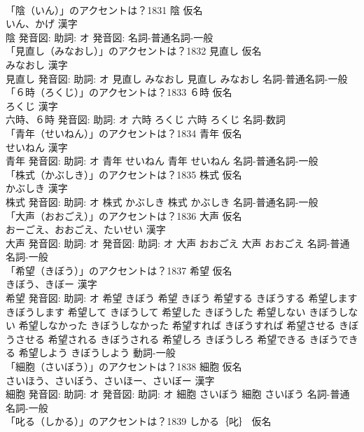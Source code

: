 \documentclass[8pt]{extreport}
\begin{document}
\begin{CJK}{UTF8}{min}
\\	「陰（いん）」のアクセントは？1831	陰 仮名　
\\	いん、かげ 漢字　
\\	陰 発音図: 助詞: オ 発音図:							名詞-普通名詞-一般 
\\	「見直し（みなおし）」のアクセントは？1832	見直し 仮名　
\\	みなおし 漢字　
\\	見直し 発音図: 助詞: オ	見直し みなおし		見直し みなおし				名詞-普通名詞-一般 
\\	「６時（ろくじ）」のアクセントは？1833	６時 仮名　
\\	ろくじ 漢字　
\\	六時、６時 発音図: 助詞: オ	六時 ろくじ		六時 ろくじ				名詞-数詞 
\\	「青年（せいねん）」のアクセントは？1834	青年 仮名　
\\	せいねん 漢字　
\\	青年 発音図: 助詞: オ	青年 せいねん		青年 せいねん				名詞-普通名詞-一般 
\\	「株式（かぶしき）」のアクセントは？1835	株式 仮名　
\\	かぶしき 漢字　
\\	株式 発音図: 助詞: オ	株式 かぶしき		株式 かぶしき				名詞-普通名詞-一般 
\\	「大声（おおごえ）」のアクセントは？1836	大声 仮名　
\\	おーごえ、おおごえ、たいせい 漢字　
\\	大声 発音図: 助詞: オ 発音図: 助詞: オ	大声 おおごえ		大声 おおごえ				名詞-普通名詞-一般 
\\	「希望（きぼう）」のアクセントは？1837	希望 仮名　
\\	きぼう、きぼー 漢字　
\\	希望 発音図: 助詞: オ	希望 きぼう		希望 きぼう 希望する きぼうする 希望します きぼうします 希望して きぼうして 希望した きぼうした 希望しない きぼうしない 希望しなかった きぼうしなかった 希望すれば きぼうすれば 希望させる きぼうさせる 希望される きぼうされる 希望しろ きぼうしろ 希望できる きぼうできる 希望しよう きぼうしよう				動詞-一般 
\\	「細胞（さいぼう）」のアクセントは？1838	細胞 仮名　
\\	さいほう、さいぼう、さいほー、さいぼー 漢字　
\\	細胞 発音図: 助詞: オ 発音図: 助詞: オ	細胞 さいぼう		細胞 さいぼう				名詞-普通名詞-一般 
\\	「叱る（しかる）」のアクセントは？1839	しかる｛叱｝ 仮名　

\end{CJK}
\end{document}
